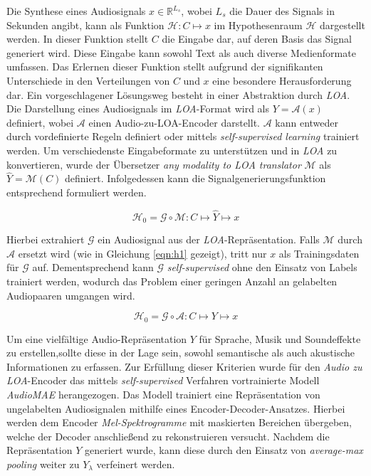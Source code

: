 \documentclass[
  a4paper,  %
  twoside,  %
  bibliography=totoc,
  headsepline,
  cleardoublepage=empty,
  parskip=half,
  draft=false
]{scrbook}
\begin{document}
Die Synthese eines Audiosignals $x \in \mathbb{R}^{L_s}$, wobei $L_s$ die Dauer des Signals in Sekunden angibt, kann als Funktion $\mathcal{H}: C \mapsto x$ im Hypothesenraum $\mathcal{H}$ dargestellt werden. In dieser Funktion stellt $C$ die Eingabe dar, auf deren Basis das Signal generiert wird. Diese Eingabe kann sowohl Text als auch diverse Medienformate umfassen. Das Erlernen dieser Funktion stellt aufgrund der signifikanten Unterschiede in den Verteilungen von $C$ und $x$ eine besondere Herausforderung dar. Ein vorgeschlagener Lösungsweg besteht in einer Abstraktion durch \emph{LOA}. Die Darstellung eines Audiosignals im \emph{LOA}-Format wird als $Y=\mathcal{A}(x)$ definiert, wobei $\mathcal{A}$ einen Audio-zu-LOA-Encoder darstellt. $\mathcal{A}$ kann entweder durch vordefinierte Regeln definiert oder mittels \emph{self-supervised learning} \cite{tan_regeneration_2023} trainiert werden. Um verschiedenste Eingabeformate zu unterstützen und in \emph{LOA} zu konvertieren, wurde der Übersetzer \emph{any modality to LOA translator} $\mathcal{M}$ als $\hat{Y}=\mathcal{M}(C)$ definiert. Infolgedessen kann die Signalgenerierungsfunktion entsprechend formuliert werden. \cite{liu_audioldm2_2023}

\begin{equation}
    \mathcal{H}_0=\mathcal{G} \circ \mathcal{M}: C \mapsto \hat{Y} \mapsto x
\end{equation}

Hierbei extrahiert $\mathcal{G}$ ein Audiosignal aus der \emph{LOA}-Repräsentation. Falls $\mathcal{M}$ durch $\mathcal{A}$ ersetzt wird  (wie in Gleichung \ref{eqn:h1} gezeigt), tritt nur $x$ als Trainingsdaten für $\mathcal{G}$ auf. Dementsprechend kann $\mathcal{G}$ \emph{self-supervised} ohne den Einsatz von Labels trainiert werden, wodurch das Problem einer geringen Anzahl an gelabelten Audiopaaren umgangen wird. \cite{liu_audioldm2_2023}

\begin{equation}
\label{eqn:h1}
    \mathcal{H}_0=\mathcal{G} \circ \mathcal{A}: C \mapsto Y \mapsto x
\end{equation}

Um eine vielfältige Audio-Repräsentation $Y$ für Sprache, Musik und Soundeffekte zu erstellen,sollte diese in der Lage sein, sowohl semantische als auch akustische Informationen zu erfassen. Zur Erfüllung dieser Kriterien wurde für den \emph{Audio zu LOA}-Encoder das mittels \emph{self-supervised} Verfahren vortrainierte Modell \emph{AudioMAE} \cite{huang_masked_2023} herangezogen. Das Modell trainiert eine Repräsentation von ungelabelten Audiosignalen mithilfe eines Encoder-Decoder-Ansatzes. Hierbei werden dem Encoder \emph{Mel-Spektrogramme} mit maskierten Bereichen übergeben, welche der Decoder anschließend zu rekonstruieren versucht. Nachdem die Repräsentation $Y$ generiert wurde, kann diese durch den Einsatz von \emph{average-max pooling} \cite{liu_simple_2023} weiter zu $Y_\lambda$ verfeinert werden. \cite{liu_audioldm2_2023}
\end{document}
